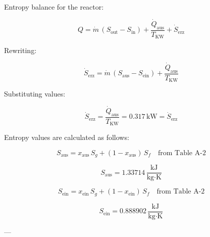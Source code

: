 Entropy balance for the reactor:  

\[
Q = \dot{m} \, (S_{\text{out}} - S_{\text{in}}) + \frac{\dot{Q}_{\text{aus}}}{T_{\text{KW}}} + \dot{S}_{\text{erz}}
\]

Rewriting:  

\[
\dot{S}_{\text{erz}} = \dot{m} \, (S_{\text{aus}} - S_{\text{ein}}) + \frac{\dot{Q}_{\text{aus}}}{T_{\text{KW}}}
\]

Substituting values:  

\[
\dot{S}_{\text{erz}} = \frac{\dot{Q}_{\text{aus}}}{T_{\text{KW}}} = 0.317 \, \text{kW} = \dot{S}_{\text{erz}}
\]

Entropy values are calculated as follows:  

\[
S_{\text{aus}} = x_{\text{aus}} \, S_g + (1 - x_{\text{aus}}) \, S_f \quad \text{from Table A-2}
\]

\[
S_{\text{aus}} = 1.33714 \, \frac{\text{kJ}}{\text{kg·K}}
\]

\[
S_{\text{ein}} = x_{\text{ein}} \, S_g + (1 - x_{\text{ein}}) \, S_f \quad \text{from Table A-2}
\]

\[
S_{\text{ein}} = 0.888902 \, \frac{\text{kJ}}{\text{kg·K}}
\]

---